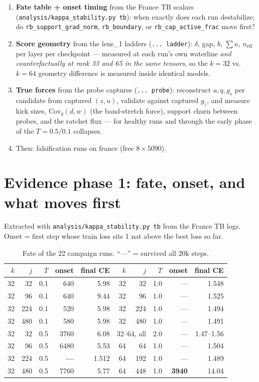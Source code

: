 \documentclass[11pt,a4paper]{article}
\newcommand{\code}[1]{\texttt{#1}}
\newcommand{\neff}{n_{\mathrm{eff}}}
\newcommand{\died}[1]{\textcolor{red!70!black}{\textbf{#1}}}
\begin{document}
\begin{enumerate}[leftmargin=1.6em]
\item \textbf{Fate table + onset timing} from the France TB scalars
  (\code{analysis/kappa\_stability.py tb}): when exactly does each run
  destabilize; do \code{rb\_support\_grad\_norm}, \code{rb\_boundary}, or
  \code{rb\_cap\_active\_frac} move first?
\item \textbf{Score geometry} from the lens\_1 ladders (\code{... ladder}):
  $\delta$, gap, $b$, $\sum\kappa$, $\neff$ per layer per checkpoint ---
  measured at each run's own waterline \emph{and counterfactually at rank 33
  and 65 in the same tensors}, so the $k{=}32$ vs.\ $k{=}64$ geometry
  difference is measured inside identical models.
\item \textbf{True forces} from the probe captures (\code{... probe}):
  reconstruct $a, q, g_s$ per candidate from captured $(z, u)$, validate
  against captured $g_z$, and measure kick sizes, $\mathrm{Cov}_q(d,w)$ (the
  band-stretch force), support churn between probes, and the ratchet flux ---
  for healthy runs and through the early phase of the $T{=}0.5/0.1$ collapses.
\item Then: falsification runs on france (free $8\times5090$).
\end{enumerate}

\section{Evidence phase 1: fate, onset, and what moves first}

Extracted with \code{analysis/kappa\_stability.py tb} from the France TB logs.
Onset = first step whose train loss sits 1 nat above the best loss so far.

\begin{table}[h]\centering\small
\begin{tabular}{rrrrr@{\hskip 2em}rrrrr}
\toprule
$k$ & $j$ & $T$ & onset & final CE & $k$ & $j$ & $T$ & onset & final CE \\
\midrule
32 & 32  & 0.1 & 640  & 5.98 & 32 & 32  & 1.0 & ---  & 1.548 \\
32 & 96  & 0.1 & 640  & 9.44 & 32 & 96  & 1.0 & ---  & 1.525 \\
32 & 224 & 0.1 & 520  & 5.98 & 32 & 224 & 1.0 & ---  & 1.494 \\
32 & 480 & 0.1 & 580  & 5.98 & 32 & 480 & 1.0 & ---  & 1.491 \\
32 & 32  & 0.5 & 3760 & 6.08 & \multicolumn{2}{r}{32--64, all} & 2.0 & --- & 1.47--1.56 \\
32 & 96  & 0.5 & 6480 & 5.53 & 64 & 64  & 1.0 & ---  & 1.504 \\
32 & 224 & 0.5 & \textbf{---} & 1.512 & 64 & 192 & 1.0 & --- & 1.489 \\
32 & 480 & 0.5 & 7760 & 5.77 & 64 & 448 & 1.0 & \died{3940} & 14.04 \\
\bottomrule
\end{tabular}
\caption{Fate of the 22 campaign runs. ``---'' = survived all 20k steps.}
\end{table}
\end{document}
